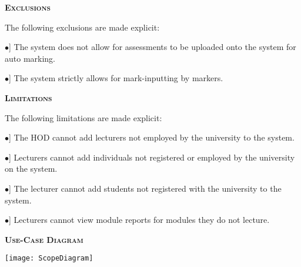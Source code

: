 \documentclass[12pt, a4paper]{scrartcl}
\newcommand{\tab}[1]{\hspace{.05\textwidth}\rlap{#1}}
\begin{document}
				\textsc{\bf Exclusions}
					\begin{description}
						\item The following exclusions are made explicit:
						\begin{description}
							\item \tab [$\bullet$] The system does not allow for assessments to be uploaded onto the system for auto marking.
							\item \tab [$\bullet$] The system strictly allows for mark-inputting by markers.
						\end{description}
 					\end{description}
 				\pagebreak
				\textsc{\bf Limitations}
					\begin{description}
						\item The following limitations are made explicit:
						\begin{description}	
							\item \tab [$\bullet$] The HOD cannot add lecturers not employed by the university to the system.	
							\item \tab [$\bullet$] Lecturers cannot add individuals not registered or employed by the university on the system.	
							\item \tab [$\bullet$] The lecturer cannot add students not registered with the university to the system.	
							\item \tab [$\bullet$] Lecturers cannot view module reports for modules they do not lecture.
						\end{description}
 					\end{description}
					\textsc{\bf Use-Case Diagram}
					\begin{description}
                		\item \texttt{[image: ScopeDiagram]}
                	\end{description}
            \pagebreak
\end{document}
